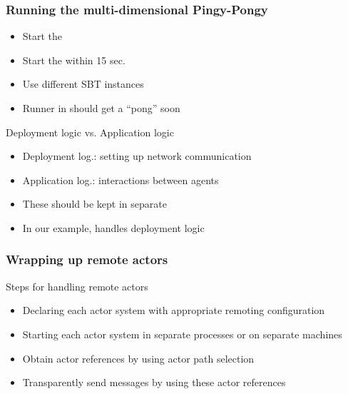 \documentclass[aspectratio=169]{beamer}
\begin{document}
\begin{frame}[t]\frametitle{Running the multi-dimensional Pingy-Pongy}

\begin{itemize}
  \item Start the 
  \item Start the  within 15 sec.
  \item Use different SBT instances
  \item Runner in  should get a ``pong'' soon
\end{itemize}
    
\pause
\begin{block}{Deployment logic vs. Application logic}
  \begin{itemize}
    \item Deployment log.: setting up network communication
    \item Application log.: interactions between agents
    \item These should be kept in separate
    \item In our example,  handles deployment logic
  \end{itemize}
\end{block}
\end{frame}

\begin{frame}[c]\frametitle{Wrapping up remote actors}
  \begin{exampleblock}{Steps for handling remote actors}    
    \begin{itemize}
      \item \alert{Declaring} each actor system with appropriate remoting configuration
      \item \alert{Starting} each actor system in separate processes or on separate machines
      \item \alert{Obtain actor references} by using actor path selection
      \item \alert{Transparently send messages} by using these actor references
    \end{itemize}
  \end{exampleblock}
\end{frame}
\end{document}

